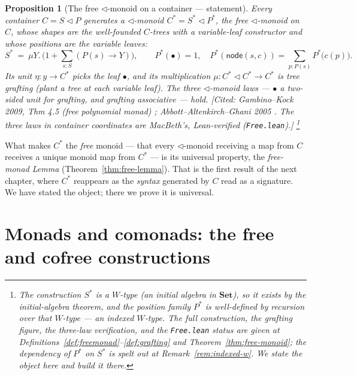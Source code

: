 \documentclass[11pt,a4paper]{book}
\newcommand{\Set}{\mathbf{Set}}
\newcommand{\cont}[2]{#1 \triangleleft #2}
\theoremstyle{plain}
\newtheorem{Proposition}[Theorem]{Proposition}
\theoremstyle{definition}
\theoremstyle{remark}
\newcommand{\prov}[1]{\hfill\textsf{\footnotesize[#1]}}
\begin{document}
\begin{Proposition}[The free $\triangleleft$-monoid on a container --- statement]
\label{prop:free-monoid-stmt}
Every container $C=\cont SP$ generates a $\triangleleft$-monoid $C^{*}=\cont{S^{*}}{P^{*}}$,
the \emph{free $\triangleleft$-monoid on $C$}, whose shapes are the well-founded $C$-trees with
a variable-leaf constructor and whose positions are the variable leaves:
\[
  S^{*}\ =\ \mu Y.\,\bigl(1+\textstyle\sum_{s:S}(P(s)\to Y)\bigr),
  \qquad
  P^{*}(\bullet)=1,\quad
  P^{*}(\mathsf{node}(s,c))=\textstyle\sum_{p:P(s)}P^{*}\!\bigl(c(p)\bigr).
\]
Its unit $\eta\colon y\to C^{*}$ picks the leaf $\bullet$, and its multiplication
$\mu\colon C^{*}\triangleleft C^{*}\to C^{*}$ is tree \emph{grafting} (plant a tree at each
variable leaf). The three $\triangleleft$-monoid laws --- $\bullet$ a two-sided unit for
grafting, and grafting associative --- hold.
\prov{Cited: Gambino--Kock 2009, Thm 4.5 (free polynomial monad) \cite{GK};
Abbott--Altenkirch--Ghani 2005 \cite{AAG05}. The three laws in container coordinates are
MacBeth's, Lean-verified (\texttt{Free.lean}).}%
\footnote{The construction $S^{*}$ is a $W$-type (an initial algebra in $\Set$), so it exists
by the initial-algebra theorem, and the position family $P^{*}$ is well-defined by recursion
\emph{over} that $W$-type --- an indexed $W$-type. The full construction, the grafting figure,
the three-law verification, and the \texttt{Free.lean} status are given at
Definitions~\ref{def:freemonad}--\ref{def:grafting} and Theorem~\ref{thm:free-monoid}; the
dependency of $P^{*}$ on $S^{*}$ is spelt out at Remark~\ref{rem:indexed-w}. We state the object
here and build it there.}
\end{Proposition}

\noindent What makes $C^{*}$ the \emph{free} monoid --- that every $\triangleleft$-monoid
receiving a map from $C$ receives a unique monoid map from $C^{*}$ --- is its universal
property, the \emph{free-monad Lemma} (Theorem~\ref{thm:free-lemma}). That is the first result
of the next chapter, where $C^{*}$ reappears as the \emph{syntax} generated by $C$ read as a
signature. We have stated the object; there we prove it is universal.

\chapter{Monads and comonads: the free and cofree constructions}
\label{ch:moncomon}
\end{document}

